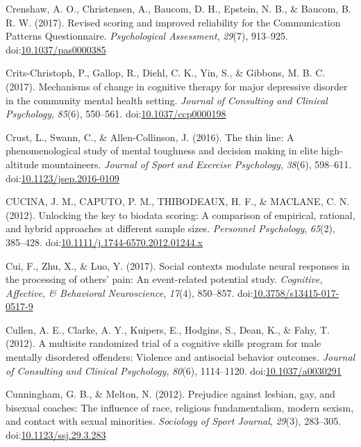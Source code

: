 \documentclass[english,man]{apa6}
\theoremstyle{definition}
\theoremstyle{definition}
\theoremstyle{definition}
\theoremstyle{remark}
\begin{document}
\hypertarget{ref-Crenshaw2016}{}
Crenshaw, A. O., Christensen, A., Baucom, D. H., Epstein, N. B., \&
Baucom, B. R. W. (2017). Revised scoring and improved reliability for
the Communication Patterns Questionnaire. \emph{Psychological
Assessment}, \emph{29}(7), 913--925.
doi:\href{https://doi.org/10.1037/pas0000385}{10.1037/pas0000385}

\hypertarget{ref-Crits-Christoph2017a}{}
Crits-Christoph, P., Gallop, R., Diehl, C. K., Yin, S., \& Gibbons, M.
B. C. (2017). Mechanisms of change in cognitive therapy for major
depressive disorder in the community mental health setting.
\emph{Journal of Consulting and Clinical Psychology}, \emph{85}(6),
550--561.
doi:\href{https://doi.org/10.1037/ccp0000198}{10.1037/ccp0000198}

\hypertarget{ref-Crust2016}{}
Crust, L., Swann, C., \& Allen-Collinson, J. (2016). The thin line: A
phenomenological study of mental toughness and decision making in elite
high-altitude mountaineers. \emph{Journal of Sport and Exercise
Psychology}, \emph{38}(6), 598--611.
doi:\href{https://doi.org/10.1123/jsep.2016-0109}{10.1123/jsep.2016-0109}

\hypertarget{ref-Cucina2012}{}
CUCINA, J. M., CAPUTO, P. M., THIBODEAUX, H. F., \& MACLANE, C. N.
(2012). Unlocking the key to biodata scoring: A comparison of empirical,
rational, and hybrid approaches at different sample sizes.
\emph{Personnel Psychology}, \emph{65}(2), 385--428.
doi:\href{https://doi.org/10.1111/j.1744-6570.2012.01244.x}{10.1111/j.1744-6570.2012.01244.x}

\hypertarget{ref-Cui2017}{}
Cui, F., Zhu, X., \& Luo, Y. (2017). Social contexts modulate neural
responses in the processing of others' pain: An event-related potential
study. \emph{Cognitive, Affective, \& Behavioral Neuroscience},
\emph{17}(4), 850--857.
doi:\href{https://doi.org/10.3758/s13415-017-0517-9}{10.3758/s13415-017-0517-9}

\hypertarget{ref-Cullen2012}{}
Cullen, A. E., Clarke, A. Y., Kuipers, E., Hodgins, S., Dean, K., \&
Fahy, T. (2012). A multisite randomized trial of a cognitive skills
program for male mentally disordered offenders: Violence and antisocial
behavior outcomes. \emph{Journal of Consulting and Clinical Psychology},
\emph{80}(6), 1114--1120.
doi:\href{https://doi.org/10.1037/a0030291}{10.1037/a0030291}

\hypertarget{ref-Cunningham2012}{}
Cunningham, G. B., \& Melton, N. (2012). Prejudice against lesbian, gay,
and bisexual coaches: The influence of race, religious fundamentalism,
modern sexism, and contact with sexual minorities. \emph{Sociology of
Sport Journal}, \emph{29}(3), 283--305.
doi:\href{https://doi.org/10.1123/ssj.29.3.283}{10.1123/ssj.29.3.283}
\end{document}
